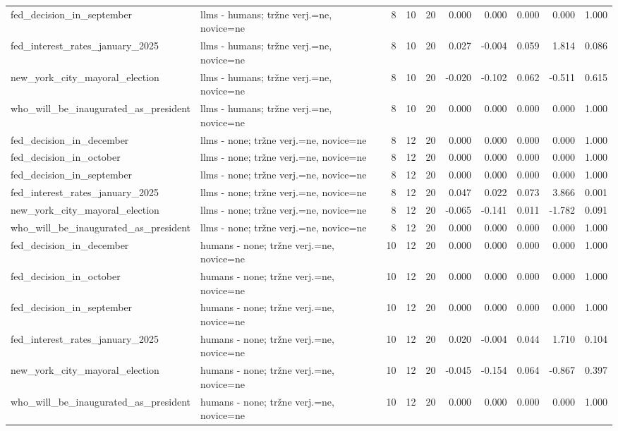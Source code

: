 \begin{longtable}{llrrrrrrrr}
fed\_decision\_in\_september & llms - humans; tržne verj.=ne, novice=ne & 8 & 10 & 20 & 0.000 & 0.000 & 0.000 & 0.000 & 1.000 \\
fed\_interest\_rates\_january\_2025 & llms - humans; tržne verj.=ne, novice=ne & 8 & 10 & 20 & 0.027 & -0.004 & 0.059 & 1.814 & 0.086 \\
new\_york\_city\_mayoral\_election & llms - humans; tržne verj.=ne, novice=ne & 8 & 10 & 20 & -0.020 & -0.102 & 0.062 & -0.511 & 0.615 \\
who\_will\_be\_inaugurated\_as\_president & llms - humans; tržne verj.=ne, novice=ne & 8 & 10 & 20 & 0.000 & 0.000 & 0.000 & 0.000 & 1.000 \\
fed\_decision\_in\_december & llms - none; tržne verj.=ne, novice=ne & 8 & 12 & 20 & 0.000 & 0.000 & 0.000 & 0.000 & 1.000 \\
fed\_decision\_in\_october & llms - none; tržne verj.=ne, novice=ne & 8 & 12 & 20 & 0.000 & 0.000 & 0.000 & 0.000 & 1.000 \\
fed\_decision\_in\_september & llms - none; tržne verj.=ne, novice=ne & 8 & 12 & 20 & 0.000 & 0.000 & 0.000 & 0.000 & 1.000 \\
fed\_interest\_rates\_january\_2025 & llms - none; tržne verj.=ne, novice=ne & 8 & 12 & 20 & 0.047 & 0.022 & 0.073 & 3.866 & 0.001 \\
new\_york\_city\_mayoral\_election & llms - none; tržne verj.=ne, novice=ne & 8 & 12 & 20 & -0.065 & -0.141 & 0.011 & -1.782 & 0.091 \\
who\_will\_be\_inaugurated\_as\_president & llms - none; tržne verj.=ne, novice=ne & 8 & 12 & 20 & 0.000 & 0.000 & 0.000 & 0.000 & 1.000 \\
fed\_decision\_in\_december & humans - none; tržne verj.=ne, novice=ne & 10 & 12 & 20 & 0.000 & 0.000 & 0.000 & 0.000 & 1.000 \\
fed\_decision\_in\_october & humans - none; tržne verj.=ne, novice=ne & 10 & 12 & 20 & 0.000 & 0.000 & 0.000 & 0.000 & 1.000 \\
fed\_decision\_in\_september & humans - none; tržne verj.=ne, novice=ne & 10 & 12 & 20 & 0.000 & 0.000 & 0.000 & 0.000 & 1.000 \\
fed\_interest\_rates\_january\_2025 & humans - none; tržne verj.=ne, novice=ne & 10 & 12 & 20 & 0.020 & -0.004 & 0.044 & 1.710 & 0.104 \\
new\_york\_city\_mayoral\_election & humans - none; tržne verj.=ne, novice=ne & 10 & 12 & 20 & -0.045 & -0.154 & 0.064 & -0.867 & 0.397 \\
who\_will\_be\_inaugurated\_as\_president & humans - none; tržne verj.=ne, novice=ne & 10 & 12 & 20 & 0.000 & 0.000 & 0.000 & 0.000 & 1.000 \\
\end{longtable}
\normalsize
